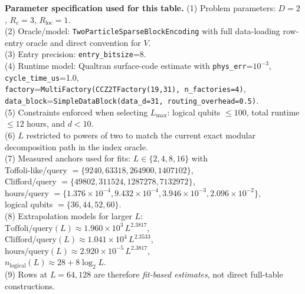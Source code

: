 \begin{table}[t]
\vspace{0.5em}
\begin{minipage}{0.98\linewidth}
\footnotesize
\textbf{Parameter specification used for this table.}
(1) Problem parameters: $D=2$, $R_c=3$, $R_{\mathrm{loc}}=1$. \\
(2) Oracle/model: \texttt{TwoParticleSparseBlockEncoding} with full data-loading row-entry oracle and direct convention for $V$. \\
(3) Entry precision: \texttt{entry\_bitsize}=8. \\
(4) Runtime model: Qualtran surface-code estimate with \texttt{phys\_err}=$10^{-3}$, \texttt{cycle\_time\_us}=1.0, \\
\hspace*{1.2em}\texttt{factory}=\texttt{MultiFactory(CCZ2TFactory(19,31), n\_factories=4)},
\texttt{data\_block}=\texttt{SimpleDataBlock(data\_d=31, routing\_overhead=0.5)}. \\
(5) Constraints enforced when selecting $L_{\max}$: logical qubits $\le 100$, total runtime $\le 12$ hours, and $d<10$. \\
(6) $L$ restricted to powers of two to match the current exact modular decomposition path in the index oracle. \\
(7) Measured anchors used for fits: $L\in\{2,4,8,16\}$ with \\
\hspace*{1.2em}Toffoli-like/query $=\{9240, 63318, 264900, 1407102\}$, \\
\hspace*{1.2em}Clifford/query $=\{49802, 311524, 1287278, 7132972\}$, \\
\hspace*{1.2em}hours/query $=\{1.376\times10^{-4}, 9.432\times10^{-4}, 3.946\times10^{-3}, 2.096\times10^{-2}\}$, \\
\hspace*{1.2em}logical qubits $=\{36,44,52,60\}$. \\
(8) Extrapolation models for larger $L$: \\
\hspace*{1.2em}$\text{Toffoli/query}(L)\approx 1.960\times 10^3\,L^{2.3817}$, \\
\hspace*{1.2em}$\text{Clifford/query}(L)\approx 1.041\times 10^4\,L^{2.3533}$, \\
\hspace*{1.2em}$\text{hours/query}(L)\approx 2.920\times 10^{-5}\,L^{2.3817}$, \\
\hspace*{1.2em}$n_{\mathrm{logical}}(L)\approx 28 + 8\log_2 L$. \\
(9) Rows at $L=64,128$ are therefore \emph{fit-based estimates}, not direct full-table constructions.
\end{minipage}
\end{table}
